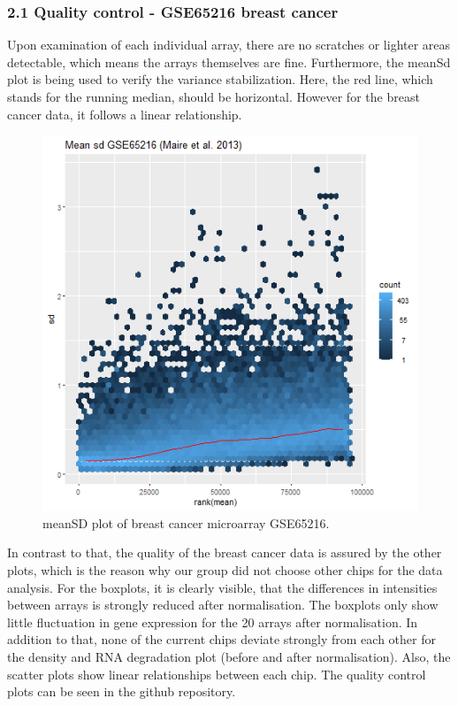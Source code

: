 \documentclass[
]{article}
\begin{document}
\hypertarget{quality-control---gse65216-breast-cancer}{%
\subsubsection{2.1 Quality control - GSE65216 breast
cancer}\label{quality-control---gse65216-breast-cancer}}

Upon examination of each individual array, there are no scratches or
lighter areas detectable, which means the arrays themselves are fine.
Furthermore, the meanSd plot is being used to verify the variance
stabilization. Here, the red line, which stands for the running median,
should be horizontal. However for the breast cancer data, it follows a
linear relationship.\\

\begin{figure}

{\centering \includegraphics[width=0.5\linewidth]{images/breast_meansdPlot} 

}

\caption{meanSD plot of breast cancer microarray GSE65216.}\label{fig:unnamed-chunk-1}
\end{figure}

In contrast to that, the quality of the breast cancer data is assured by
the other plots, which is the reason why our group did not choose other
chips for the data analysis. For the boxplots, it is clearly visible,
that the differences in intensities between arrays is strongly reduced
after normalisation. The boxplots only show little fluctuation in gene
expression for the 20 arrays after normalisation. In addition to that,
none of the current chips deviate strongly from each other for the
density and RNA degradation plot (before and after normalisation). Also,
the scatter plots show linear relationships between each chip. The
quality control plots can be seen in the github repository.
\end{document}
